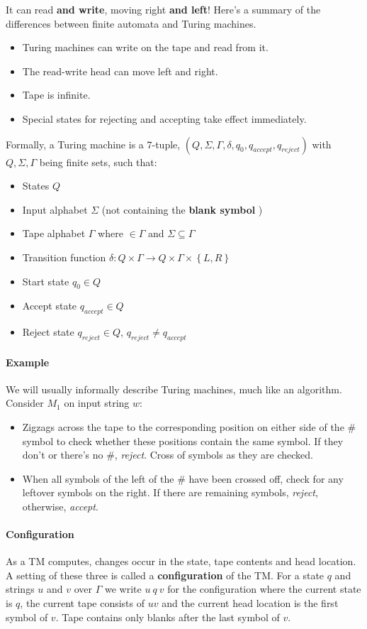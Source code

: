 \documentclass[12 pt]{article}
\begin{document}
It can read \textbf{and write}, moving right \textbf{and left}! Here's
a summary of the differences between finite automata and Turing
machines.
\begin{itemize}
\item Turing machines can write on the tape and read from it.
\item The read-write head can move left and right.
\item Tape is infinite.
\item Special states for rejecting and accepting take effect immediately.
\end{itemize}
Formally, a Turing machine is a $7$-tuple, $(Q, \Sigma, \Gamma, \delta,
q_0, q_{accept}, q_{reject})$ with $Q, \Sigma, \Gamma$ being finite
sets, such that:
\begin{itemize}
\item States $Q$
\item Input alphabet $\Sigma$ (not containing the \textbf{blank
    symbol} \textvisiblespace)
\item Tape alphabet $\Gamma$ where \textvisiblespace $\in \Gamma$ and
  $\Sigma \subseteq \Gamma$
\item Transition function $\delta: Q \times \Gamma \to Q \times \Gamma
  \times \left\{L, R\right\}$
\item Start state $q_0 \in Q$
\item Accept state $q_{accept} \in Q$
\item Reject state $q_{reject} \in Q$, $q_{reject} \neq q_{accept}$
\end{itemize}
\paragraph{Example} We will usually informally describe Turing
machines, much like an algorithm. Consider $M_1$ on input string $w$:
\begin{itemize}
\item Zigzags across the tape to the corresponding position on either
  side of the $\#$ symbol to check whether these positions contain the
  same symbol. If they don't or there's no $\#$,
  \textit{reject}. Cross of symbols as they are checked.
\item When all symbols of the left of the $\#$ have been crossed off,
  check for any leftover symbols on the right. If there are remaining
  symbols, \textit{reject}, otherwise, \textit{accept}.
\end{itemize}
\paragraph{Configuration}
As a TM computes, changes occur in the state, tape contents and head
location. A setting of these three is called a \textbf{configuration}
of the TM. For a state $q$ and strings $u$ and $v$ over $\Gamma$ we
write $u\ q \ v$ for the configuration where the current state is $q$,
the current tape consists of $uv$ and the current head location is the
first symbol of $v$. Tape contains only blanks after the last symbol
of $v$.
\end{document}

